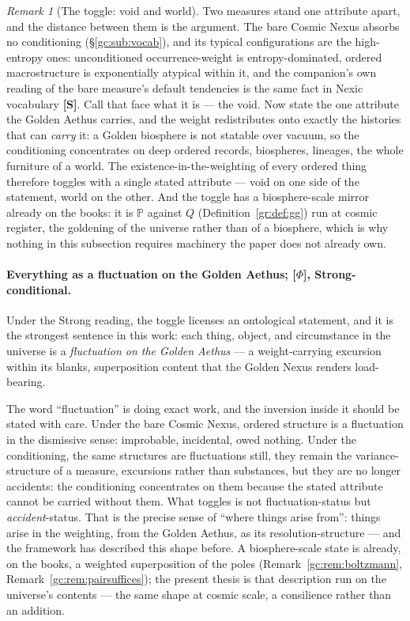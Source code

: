 \documentclass[11pt]{article}
\numberwithin{equation}{section}
\theoremstyle{plain}
\theoremstyle{definition}
\theoremstyle{remark}
\newtheorem{remark}[theorem]{Remark}
\newcommand{\PP}{\mathbb{P}}
\begin{document}
\begin{remark}[The toggle: void and world]\label{to:rem:toggle}
Two measures stand one attribute apart, and the distance between them
is the argument. The bare Cosmic Nexus absorbs no conditioning
(\S\ref{gc:sub:vocab}), and its typical configurations are the
high-entropy ones: unconditioned occurrence-weight is
entropy-dominated, ordered macrostructure is exponentially atypical
within it, and the companion's own reading of the bare measure's
default tendencies is the same fact in Nexic vocabulary
\cite{Nexus} \textbf{[S]}. Call that face what it is --- the void.
Now state the one attribute the Golden Aethus carries, and the weight
redistributes onto exactly the histories that can \emph{carry} it: a
Golden biosphere is not statable over vacuum, so the conditioning
concentrates on deep ordered records, biospheres, lineages, the whole
furniture of a world. The existence-in-the-weighting of every ordered
thing therefore toggles with a single stated attribute --- void on one
side of the statement, world on the other. And the toggle has a
biosphere-scale mirror already on the books: it is $\PP$ against $Q$
(Definition~\ref{gr:def:gg}) run at cosmic register, the goldening
of the universe rather than of a biosphere, which is why nothing in
this subsection requires machinery the paper does not already own.
\end{remark}

\paragraph{Everything as a fluctuation on the Golden Aethus;
\textbf{[$\Phi$]}, Strong-conditional.}\label{to:rem:fluctuation}
Under the Strong reading, the toggle licenses an ontological
statement, and it is the strongest sentence in this work: each thing,
object, and circumstance in the universe is a \emph{fluctuation on the
Golden Aethus} --- a weight-carrying excursion within its blanks,
superposition content that the Golden Nexus renders load-bearing.

The word ``fluctuation'' is doing exact work, and the inversion inside
it should be stated with care. Under the bare Cosmic Nexus, ordered
structure is a fluctuation in the dismissive sense: improbable,
incidental, owed nothing. Under the conditioning, the same structures
are fluctuations still, they remain the variance-structure of a
measure, excursions rather than substances, but they are no longer
accidents: the conditioning concentrates on them because the stated
attribute cannot be carried without them. What toggles is not
fluctuation-status but \emph{accident}-status. That is the precise
sense of ``where things arise from'': things arise in the weighting,
from the Golden Aethus, as its resolution-structure --- and the
framework has described this shape before. A biosphere-scale state is
already, on the books, a weighted superposition of the poles
(Remark~\ref{gc:rem:boltzmann}, Remark~\ref{gc:rem:pairsuffices});
the present thesis is that description run on the universe's contents
--- the same shape at cosmic scale, a consilience rather than an
addition.
\end{document}
